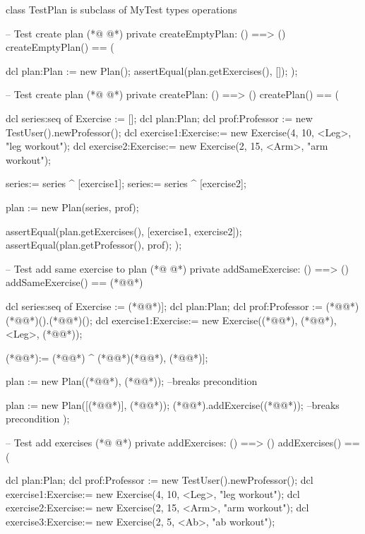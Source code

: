 \begin{vdmpp}[breaklines=true]
class TestPlan is subclass of MyTest
types
operations
 
 
 -- Test create plan 
(*@
\label{createEmptyPlan:7}
@*)
 private createEmptyPlan: () ==> ()
 createEmptyPlan() == (
    
    dcl plan:Plan := new Plan();
    assertEqual(plan.getExercises(), []);
 );
 
 
 -- Test create plan 
(*@
\label{createPlan:16}
@*)
 private createPlan: () ==> ()
 createPlan() == (
    
    dcl series:seq of Exercise := [];
    dcl plan:Plan;
    dcl prof:Professor := new TestUser().newProfessor(); 
    dcl exercise1:Exercise:= new Exercise(4, 10, <Leg>, "leg workout");
    dcl exercise2:Exercise:= new Exercise(2, 15, <Arm>, "arm workout");
    
    series:= series ^ [exercise1];
    series:= series ^ [exercise2];
    
    plan := new Plan(series, prof);
    
    assertEqual(plan.getExercises(), [exercise1, exercise2]);
    assertEqual(plan.getProfessor(), prof);
 );
 
 -- Test add same exercise to plan
(*@
\label{addSameExercise:35}
@*)
 private addSameExercise: () ==> ()
 addSameExercise() == (*@\vdmnotcovered{(}@*)
    
    dcl series:seq of Exercise := (*@\vdmnotcovered{[}@*)];
    dcl plan:Plan;
    dcl prof:Professor := (*@@*) (*@@*)().(*@@*)(); 
    dcl exercise1:Exercise:= new Exercise((*@@*), (*@@*), <Leg>, (*@@*));
    
    (*@@*):= (*@@*) ^ (*@\vdmnotcovered{[}@*)(*@@*), (*@@*)];
  
    plan := new Plan((*@@*), (*@@*));    --breaks precondition
    
    plan := new Plan([(*@@*)], (*@@*));
    (*@@*).addExercise((*@@*));     --breaks precondition
 );
 
 
  -- Test add exercises
(*@
\label{addExercises:53}
@*)
 private addExercises: () ==> ()
 addExercises() == (
    
    dcl plan:Plan;
    dcl prof:Professor := new TestUser().newProfessor(); 
    dcl exercise1:Exercise:= new Exercise(4, 10, <Leg>, "leg workout");
    dcl exercise2:Exercise:= new Exercise(2, 15, <Arm>, "arm workout");
     dcl exercise3:Exercise:= new Exercise(2, 5, <Ab>, "ab workout");
  

\end{vdmpp}
